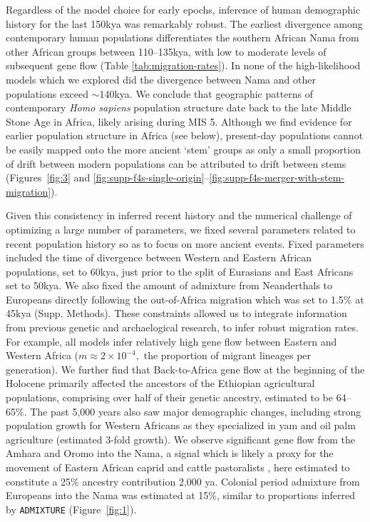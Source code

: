\documentclass[]{article}
\begin{document}
Regardless of the model choice for early epochs, inference of human demographic
history for the last 150kya was remarkably robust. The earliest divergence among
contemporary human populations differentiates the southern African Nama from
other African groups between 110--135kya, with low to moderate levels of
subsequent gene flow (Table \ref{tab:migration-rates}). In none of the
high-likelihood models which we explored did the divergence between Nama and
other populations exceed $\sim$140kya. 
We conclude that geographic patterns of contemporary \emph{Homo sapiens} population structure
date back to the late Middle Stone Age in Africa, likely arising during MIS 5.
Although we find evidence for earlier population structure in Africa (see
below), present-day populations cannot be easily mapped onto the more ancient
`stem' groups as only a small proportion of drift between modern populations can
be attributed to drift between stems (Figures~\ref{fig:3} and
\ref{fig:supp-f4s-single-origin}--\ref{fig:supp-f4s-merger-with-stem-migration}). 

Given this consistency in inferred recent history and the numerical challenge
of optimizing a large number of parameters, we fixed several parameters related
to recent population history so as to focus on more ancient events. 
Fixed parameters included
the time of divergence between Western and Eastern African populations,
set to 60kya, just prior to the split of Eurasians and East Africans set to 50kya. 
We also fixed the amount of admixture from Neanderthals to Europeans directly
following the out-of-Africa migration which was set to 1.5\% at 45kya (Supp. Methods). These constraints allowed us to integrate information from previous genetic and archaelogical research,
to infer robust migration rates. For example, all models infer relatively high gene flow between Eastern and Western Africa
($m\approx2\times10^{-4},$ the proportion of migrant lineages per generation). We further find that Back-to-Africa gene flow at the beginning of the Holocene primarily
affected the ancestors of the Ethiopian agricultural populations, comprising
over half of their genetic ancestry, estimated to be 64--65\%. The past 5,000
years also saw major demographic changes, including strong population growth
for Western Africans as they specialized in yam and oil palm agriculture
(estimated 3-fold growth). We observe significant gene flow from the Amhara and
Oromo into the Nama, a signal which is likely a proxy for the movement of
Eastern African caprid and cattle pastoralists
\citep{Henn2008-xo,Breton2014-xb}, here estimated to constitute a 25\% ancestry
contribution 2,000 ya. Colonial period admixture from Europeans into the Nama
was estimated at 15\%, similar to proportions inferred by \texttt{ADMIXTURE} (Figure~\ref{fig:1}).
\end{document}
